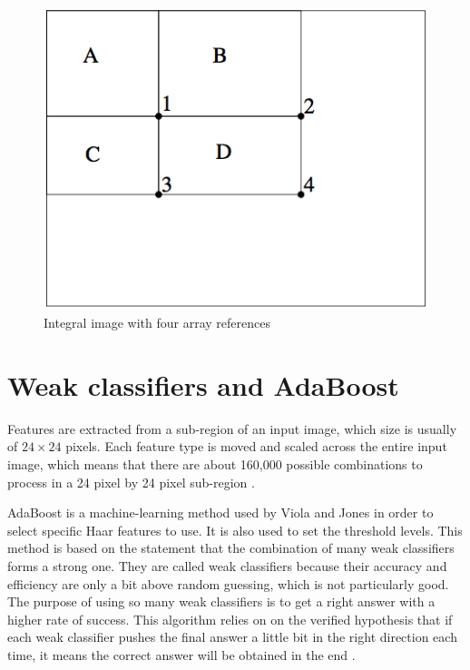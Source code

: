 \begin{figure}[!h]
\begin{center}
\noindent \includegraphics[scale=0.6]{figures/integral_image_four_array} 
\newline
\caption{Integral image with four array references}
\label{integral_image_four_array}
\end{center} 
\end{figure}

\section{Weak classifiers and AdaBoost}

\vspace{\baselineskip}
\noindent Features are extracted from a sub-region of an input image, which size is usually of $ 24\times24 $ pixels. Each feature type is moved and scaled across the entire input image, which means that there are about 160,000 possible combinations to process in a 24 pixel by 24 pixel sub-region \cite{SMY07}.
\newline

\noindent AdaBoost is a machine-learning method used by Viola and Jones in order to select specific Haar features to use. It is also used to set the threshold levels. This method is based on the statement that the combination of many weak classifiers forms a strong one. They are called weak classifiers because their accuracy and efficiency are only a bit above random guessing, which is not particularly good. The purpose of using so many weak classifiers is to get a right answer with a higher rate of success. This algorithm relies on on the verified hypothesis that if each weak classifier pushes the final answer a little bit in the right direction each time, it means the correct answer will be obtained in the end \cite{HEW07}. 
\newline

